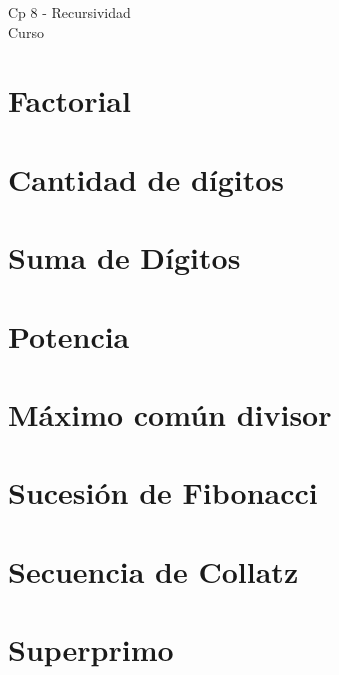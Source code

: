 \begin{center}
    \begin{large}
    Cp 8 - Recursividad\\
    Curso \academicyear\\
    \end{large}
\end{center}

\section{Factorial}


\section{Cantidad de dígitos}


\section{Suma de Dígitos}


\section{Potencia}


\section{Máximo común divisor}


\section{Sucesión de Fibonacci}


\section{Secuencia de Collatz}


\section{Superprimo}


